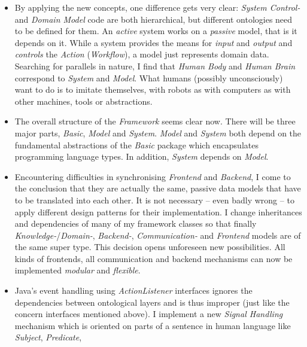 \begin{itemize}
    \item[2002] By applying the new concepts, one difference gets very clear:
        \emph{System Control-} and \emph{Domain Model} code are both
        hierarchical, but different ontologies need to be defined for them.
        An \emph{active} system works on a \emph{passive} model, that is it
        depends on it. While a system provides the means for \emph{input} and
        \emph{output} and \emph{controls} the \emph{Action} (\emph{Workflow}),
        a model just represents domain data. Searching for parallels in nature,
        I find that \emph{Human Body} and \emph{Human Brain} correspond to
        \emph{System} and \emph{Model}. What humans (possibly unconsciously)
        want to do is to imitate themselves, with robots as with computers as
        with other machines, tools or abstractions.
    \item[2002] The overall structure of the \emph{Framework} seems clear now.
        There will be three major parts, \emph{Basic}, \emph{Model} and
        \emph{System}. \emph{Model} and \emph{System} both depend on the
        fundamental abstractions of the \emph{Basic} package which encapsulates
        programming language types. In addition, \emph{System} depends on
        \emph{Model}.
    \item[2003] Encountering difficulties in synchronising \emph{Frontend} and
        \emph{Backend}, I come to the conclusion that they are actually the
        same, passive data models that have to be translated into each other.
        It is not necessary -- even badly wrong -- to apply different design
        patterns for their implementation. I change inheritances and
        dependencies of many of my framework classes so that finally
        \emph{Knowledge-}/\emph{Domain-}, \emph{Backend-}, \emph{Communication-}
        and \emph{Frontend} models are of the same super type. This decision
        opens unforeseen new possibilities. All kinds of frontends, all
        communication and backend mechanisms can now be implemented
        \emph{modular} and \emph{flexible}.
    \item[2003] Java's event handling using \emph{ActionListener} interfaces
        ignores the dependencies between ontological layers and is thus improper
        (just like the concern interfaces mentioned above). I implement a new
        \emph{Signal Handling} mechanism which is oriented on parts of a
        sentence in human language like \emph{Subject}, \emph{Predicate},

\end{itemize}
